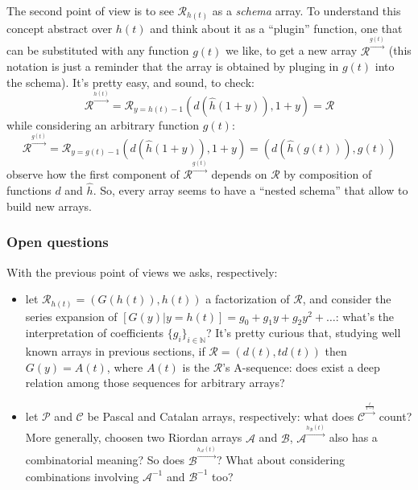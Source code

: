 \documentclass[11pt,a4paper]{article} %
\begin{document}
    The second point of view is to see $\mathcal{R}_{h(t)}$ as a \emph{schema} array.
    To understand this concept abstract over $h(t)$ and think about it as a ``plugin''
    function, one that can be substituted with any function $g(t)$ we like, to get a new array
    $\mathcal{R}^{\stackrel{g(t)}{\rightarrow}}$ (this notation is just a reminder that the array is obtained
    by pluging in $g(t)$ into the schema). It's pretty easy, and sound, to check:
    \begin{displaymath}
        \mathcal{R}^{\stackrel{h(t)}{\rightarrow}} = \mathcal{R}_{y=h(t)-1}\left( d(\hat{h}(1+y)), 1+y \right) = \mathcal{R}
    \end{displaymath}
    while considering an arbitrary function $g(t)$:
    \begin{displaymath}
        \mathcal{R}^{\stackrel{g(t)}{\rightarrow}} = \mathcal{R}_{y=g(t)-1}\left( d(\hat{h}(1+y)), 1+y \right) = 
        \left( d(\hat{h}(g(t))), g(t) \right) 
    \end{displaymath}
    observe how the first component of $\mathcal{R}^{\stackrel{g(t)}{\rightarrow}}$ depends on
    $\mathcal{R}$ by composition of functions $d$ and $\hat{h}$. So, every array seems to have
    a ``nested schema'' that allow to build new arrays.


    \subsubsection{Open questions}

    With the previous point of views we asks, respectively:
    \begin{itemize}
        \item let $\mathcal{R}_{h(t)}=\left(G(h(t)), h(t)\right)$ a factorization of $\mathcal{R}$,
            and consider the series expansion of $[G(y)|y=h(t)]=g_0 + g_1 y + g_2 y^2 + \ldots$: 
            what's the interpretation of coefficients $\lbrace g_i\rbrace_{i\in\mathbb{N}}$? It's pretty
            curious that, studying well known arrays in previous sections, 
            if $\mathcal{R}=\left(d(t), td(t)\right)$ then $G(y) = A(t)$, where $A(t)$
            is the $\mathcal{R}$'s A-sequence: does exist a deep relation among those sequences for arbitrary
            arrays?   
        \item let $\mathcal{P}$ and $\mathcal{C}$ be Pascal and Catalan arrays, respectively: 
            what does $\mathcal{C}^{\stackrel{\frac{t}{1-t}}{\rightarrow}}$ count? 
            More generally, choosen two Riordan arrays $\mathcal{A}$ and $\mathcal{B}$, 
            $\mathcal{A}^{\stackrel{h_{\mathcal{B}}(t)}{\rightarrow}}$ also has a combinatorial meaning? 
            So does $\mathcal{B}^{\stackrel{h_{\mathcal{A}}(t)}{\rightarrow}}$? What about considering
            combinations involving  $\mathcal{A}^{-1}$ and $\mathcal{B}^{-1}$ too?
    \end{itemize}
\end{document}
